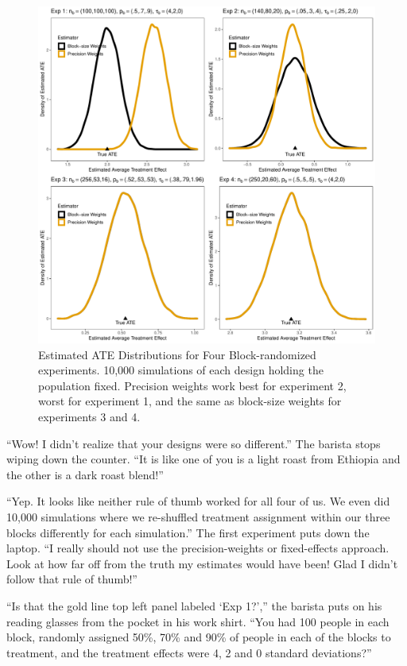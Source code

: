 \documentclass[
]{article}
\begin{document}
\begin{figure}

{\centering \includegraphics[width=0.8\linewidth]{g_all} 

}

\caption{Estimated ATE Distributions for Four Block-randomized experiments. 10,000 simulations of each design holding the population fixed. Precision weights work best for experiment 2, worst for experiment 1, and the same as block-size weights for experiments 3 and 4.}\label{fig:results}
\end{figure}

``Wow! I didn't realize that your designs were so different.'' The barista stops wiping down the counter. ``It is like one of you is a light roast from Ethiopia and the other is a dark roast blend!''

``Yep. It looks like neither rule of thumb worked for all four of us. We even
did 10,000 simulations where we re-shuffled treatment assignment within our
three blocks differently for each simulation.'' The first experiment puts down
the laptop. ``I really should not use the precision-weights or fixed-effects
approach. Look at how far off from the truth my estimates would have been! Glad
I didn't follow that rule of thumb!''

``Is that the gold line top left panel labeled `Exp 1?','' the barista puts on his reading glasses from the pocket in his work shirt. ``You had 100 people in each block, randomly assigned 50\%, 70\% and 90\% of people in each of the blocks to treatment, and the treatment effects were 4, 2 and 0 standard deviations?''
\end{document}
